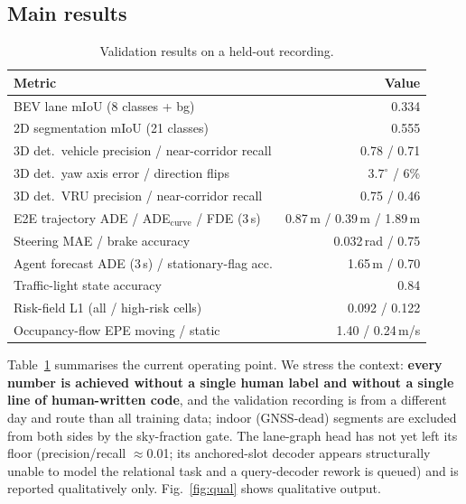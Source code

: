 \documentclass[10pt,twocolumn]{article}
\begin{document}
\subsection{Main results}
\begin{table}[t]
\centering\small
\caption{Validation results on a held-out recording.}
\label{tab:main}
\begin{tabular}{@{}lr@{}}
\toprule
Metric & Value\\
\midrule
BEV lane mIoU (8 classes + bg) & 0.334\\
2D segmentation mIoU (21 classes) & 0.555\\
3D det.\ vehicle precision / near-corridor recall & 0.78 / 0.71\\
3D det.\ yaw axis error / direction flips & $3.7^\circ$ / 6\%\\
3D det.\ VRU precision / near-corridor recall & 0.75 / 0.46\\
E2E trajectory ADE / ADE$_\mathrm{curve}$ / FDE (3\,s) & 0.87\,m / 0.39\,m / 1.89\,m\\
Steering MAE / brake accuracy & 0.032\,rad / 0.75\\
Agent forecast ADE (3\,s) / stationary-flag acc. & 1.65\,m / 0.70\\
Traffic-light state accuracy & 0.84\\
Risk-field L1 (all / high-risk cells) & 0.092 / 0.122\\
Occupancy-flow EPE moving / static & 1.40 / 0.24\,m/s\\
\bottomrule
\end{tabular}
\end{table}

Table~\ref{tab:main} summarises the current operating point. We stress the
context: \textbf{every number is achieved without a single human label and
without a single line of human-written code}, and the validation recording is
from a different day and route than all training data; indoor (GNSS-dead)
segments are excluded from both sides by the sky-fraction gate. The
lane-graph head has not yet left its floor (precision/recall $\approx$0.01;
its anchored-slot decoder appears structurally unable to model the relational
task and a query-decoder rework is queued) and is reported qualitatively
only. Fig.~\ref{fig:qual} shows qualitative output.
\end{document}
